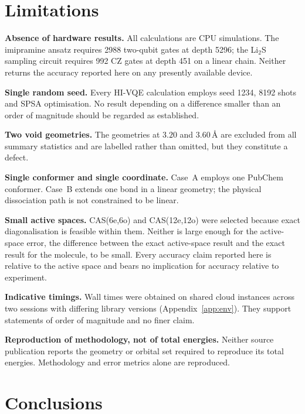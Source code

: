 \documentclass[11pt,a4paper]{article}
\newcommand{\Ang}{\ensuremath{\,\text{\AA}}}
\newcommand{\LiS}{\texorpdfstring{Li$_2$S}{Li2S}}
\begin{document}
\section{Limitations}
\label{sec:limitations}

\textbf{Absence of hardware results.} All calculations are CPU simulations. The
imipramine ansatz requires 2988 two-qubit gates at depth 5296; the \LiS{}
sampling circuit requires 992 CZ gates at depth 451 on a linear chain. Neither
returns the accuracy reported here on any presently available device.

\textbf{Single random seed.} Every HI-VQE calculation employs seed 1234, 8192
shots and SPSA optimisation. No result depending on a difference smaller than
an order of magnitude should be regarded as established.

\textbf{Two void geometries.} The geometries at $3.20$ and $3.60\Ang$ are
excluded from all summary statistics and are labelled rather than omitted, but
they constitute a defect.

\textbf{Single conformer and single coordinate.} Case~A employs one PubChem
conformer. Case~B extends one bond in a linear geometry; the physical
dissociation path is not constrained to be linear.

\textbf{Small active spaces.} CAS(6e,6o) and CAS(12e,12o) were selected because
exact diagonalisation is feasible within them. Neither is large enough for the
active-space error, the difference between the exact active-space result and
the exact result for the molecule, to be small. Every accuracy claim reported
here is relative to the active space and bears no implication for accuracy
relative to experiment.

\textbf{Indicative timings.} Wall times were obtained on shared cloud instances
across two sessions with differing library versions
(Appendix~\ref{app:env}). They support statements of order of magnitude and no
finer claim.

\textbf{Reproduction of methodology, not of total energies.} Neither source
publication reports the geometry or orbital set required to reproduce its total
energies. Methodology and error metrics alone are reproduced.

\section{Conclusions}
\label{sec:conclusion}
\end{document}
